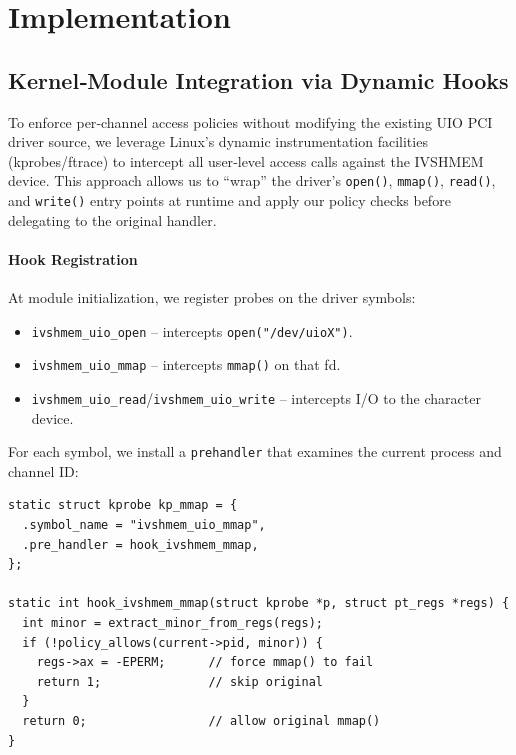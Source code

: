 \documentclass[conference]{IEEEtran}
\begin{document}

\section{Implementation}

\subsection{Kernel‐Module Integration via Dynamic Hooks}

To enforce per‐channel access policies without modifying the existing UIO PCI
driver source, we leverage Linux’s dynamic instrumentation facilities
(kprobes/ftrace) to intercept all user‐level access calls against the IVSHMEM
device. This approach allows us to “wrap” the driver’s \texttt{open()},
\texttt{mmap()}, \texttt{read()}, and \texttt{write()} entry points at runtime
and apply our policy checks before delegating to the original handler.

\paragraph{Hook Registration}
At module initialization, we register probes on the driver symbols:

\begin{itemize}
  \item \texttt{ivshmem\_uio\_open} – intercepts \texttt{open("/dev/uioX")}.
  \item \texttt{ivshmem\_uio\_mmap} – intercepts \texttt{mmap()} on that fd.
  \item \texttt{ivshmem\_uio\_read}/\texttt{ivshmem\_uio\_write} – intercepts I/O to the character device.
\end{itemize}

For each symbol, we install a \texttt{prehandler} that examines the current
process and channel ID:

\begin{verbatim}
static struct kprobe kp_mmap = {
  .symbol_name = "ivshmem_uio_mmap",
  .pre_handler = hook_ivshmem_mmap,
};

static int hook_ivshmem_mmap(struct kprobe *p, struct pt_regs *regs) {
  int minor = extract_minor_from_regs(regs);
  if (!policy_allows(current->pid, minor)) {
    regs->ax = -EPERM;      // force mmap() to fail
    return 1;               // skip original
  }
  return 0;                 // allow original mmap()
}
\end{verbatim}
\end{document}

